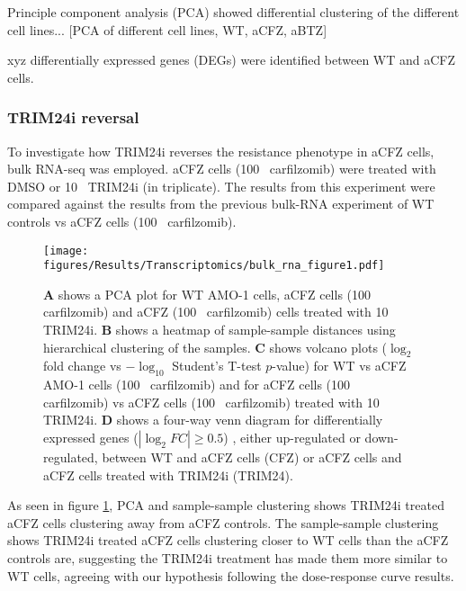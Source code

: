 Principle component analysis (PCA) showed differential clustering of the different cell lines...
[PCA of different cell lines, WT, aCFZ, aBTZ]


xyz differentially expressed genes (DEGs) were identified between WT and aCFZ cells.

\subsubsection{TRIM24i reversal}
To investigate how TRIM24i reverses the resistance phenotype in aCFZ cells, bulk RNA-seq was employed.
aCFZ cells (100\si{\nano\Molar} carfilzomib) were treated with DMSO or 10\si{\mu\Molar} TRIM24i (in triplicate).
The results from this experiment were compared against the results from the previous bulk-RNA experiment of WT controls vs aCFZ cells (100\si{\nano\Molar} carfilzomib).

\begin{figure}[htb]
\centering
\texttt{[image: figures/Results/Transcriptomics/bulk\_rna\_figure1.pdf]}
\caption[WT, aCFZ and TRIM24i reversal, transcriptomics differential expression and clustering]{\textbf{A} shows a PCA plot for WT AMO-1 cells, aCFZ cells (100\si{\nano\Molar} carfilzomib) and aCFZ (100\si{\nano\Molar} carfilzomib) cells treated with 10\si{\mu\Molar} TRIM24i.
\textbf{B} shows a heatmap of sample-sample distances using hierarchical clustering of the samples.
\textbf{C} shows volcano plots ($\log_{2}$ fold change vs $-\log_{10}$ Student's T-test $p$-value) for WT vs aCFZ AMO-1 cells (100\si{\nano\Molar} carfilzomib) and for aCFZ cells (100\si{\nano\Molar} carfilzomib) vs aCFZ cells (100\si{\nano\Molar} carfilzomib) treated with 10\si{\mu\Molar} TRIM24i.
\textbf{D} shows a four-way venn diagram for differentially expressed genes ($|\log_{2}FC| \geq0.5$) , either up-regulated or down-regulated, between WT and aCFZ cells (CFZ) or aCFZ cells and aCFZ cells treated with TRIM24i (TRIM24).}
\label{fig:bulk_fig1_de_clustering}
\end{figure}

As seen in figure \ref{fig:bulk_fig1_de_clustering}, PCA and sample-sample clustering shows TRIM24i treated aCFZ cells clustering away from aCFZ controls.
The sample-sample clustering shows TRIM24i treated aCFZ cells clustering closer to WT cells than the aCFZ controls are, suggesting the TRIM24i treatment has made them more similar to WT cells, agreeing with our hypothesis following the dose-response curve results.

